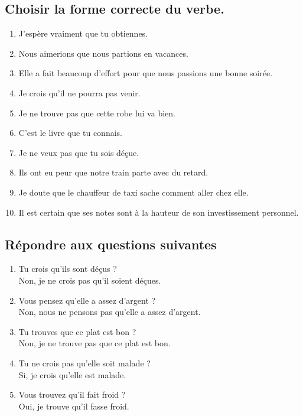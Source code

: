 \documentclass[12pt]{article}
\begin{document}
\subsection{Choisir la forme correcte du verbe.}
\begin{enumerate}
	\item J’espère vraiment que tu obtiennes.
	\item Nous aimerions que nous partions en vacances.
	\item Elle a fait beaucoup d’effort pour que nous passions une bonne soirée.
	\item Je crois qu’il ne pourra pas venir.
	\item Je ne trouve pas que cette robe lui va bien.
	\item C’est le livre que tu connais.
	\item Je ne veux pas que tu sois déçue.
	\item Ils ont eu peur que notre train parte avec du retard.
	\item Je doute que le chauffeur de taxi sache comment aller chez elle.
	\item Il est certain que ses notes sont à la hauteur de son investissement personnel.
\end{enumerate}
\subsection{Répondre aux questions suivantes}
\begin{enumerate}
	\item Tu crois qu’ils sont déçus ? \\
		Non, je ne crois pas qu'il soient déçues.
	\item Vous pensez qu’elle a assez d’argent ? \\
		Non, nous ne pensons pas qu'elle a assez d'argent.
	\item Tu trouves que ce plat est bon ? \\
		Non, je ne trouve pas que ce plat est bon.
	\item Tu ne crois pas qu’elle soit malade ? \\
		Si, je crois qu'elle est malade.
	\item Vous trouvez qu’il fait froid ? \\
		Oui, je trouve qu'il fasse froid.
\end{enumerate}
\end{document}
